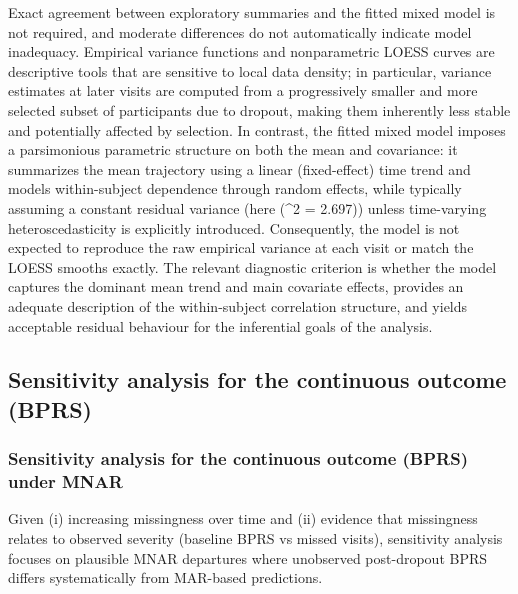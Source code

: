 \documentclass[
  11pt,
  letterpaper,
  DIV=11,
  numbers=noendperiod]{scrartcl}
\begin{document}
Exact agreement between exploratory summaries and the fitted mixed model
is not required, and moderate differences do not automatically indicate
model inadequacy. Empirical variance functions and nonparametric LOESS
curves are descriptive tools that are sensitive to local data density;
in particular, variance estimates at later visits are computed from a
progressively smaller and more selected subset of participants due to
dropout, making them inherently less stable and potentially affected by
selection. In contrast, the fitted mixed model imposes a parsimonious
parametric structure on both the mean and covariance: it summarizes the
mean trajectory using a linear (fixed-effect) time trend and models
within-subject dependence through random effects, while typically
assuming a constant residual variance (here (\widehat{\sigma}\^{}2 =
2.697)) unless time-varying heteroscedasticity is explicitly introduced.
Consequently, the model is not expected to reproduce the raw empirical
variance at each visit or match the LOESS smooths exactly. The relevant
diagnostic criterion is whether the model captures the dominant mean
trend and main covariate effects, provides an adequate description of
the within-subject correlation structure, and yields acceptable residual
behaviour for the inferential goals of the analysis.

\subsection{Sensitivity analysis for the continuous outcome
(BPRS)}\label{sensitivity-analysis-for-the-continuous-outcome-bprs}

\subsubsection{Sensitivity analysis for the continuous outcome (BPRS)
under
MNAR}\label{sensitivity-analysis-for-the-continuous-outcome-bprs-under-mnar}

Given (i) increasing missingness over time and (ii) evidence that
missingness relates to observed severity (baseline BPRS vs missed
visits), sensitivity analysis focuses on plausible MNAR departures where
unobserved post-dropout BPRS differs systematically from MAR-based
predictions.
\end{document}
